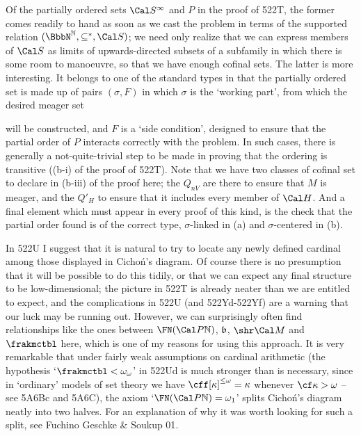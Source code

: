 {Of the partially ordered sets $\Cal S^{\infty}$ and $P$ in the proof of
522T, the former comes readily to hand as soon as we cast the problem in
terms of the supported relation $(\NN,\subseteq^*,\Cal S)$;  we need
only realize that we can express members of $\Cal S$ as limits of
upwards-directed subsets of a subfamily in which there is some room to
manoeuvre, so that we have enough cofinal sets.   The latter is more
interesting.   It belongs to one of the standard types in that the
partially ordered set is made up of pairs $(\sigma,F)$ in which $\sigma$
is the `working part', from which the desired meager set


\noindent will be constructed, and $F$ is a `side condition', designed
to ensure that the partial order of $P$ interacts correctly with the
problem.   In such cases, there is generally a not-quite-trivial step to
be made in proving that the ordering is transitive ((b-i) of the proof
of 522T).   Note that we have two classes of cofinal set to declare in
(b-iii) of the proof here;  the $Q_{nV}$ are there to ensure that $M$ is
meager, and the $Q'_H$ to ensure that it includes every member of
$\Cal H$.   And a final element which must appear in every proof of this
kind, is the check that the partial order found is of the correct
type, $\sigma$-linked in (a) and $\sigma$-centered in (b).

In 522U I suggest that it is natural to try to locate any newly defined
cardinal among those displayed in Cicho\'n's diagram.   Of course there
is no presumption that it will be possible to do this tidily, or that we
can expect any final structure to be low-dimensional;  the picture in
522T is already neater than we are entitled to expect, and the
complications in 522U (and 522Yd-522Yf) %
are a warning that our luck may be running out.   However, we can
surprisingly often find relationships like the ones between
$\FN(\Cal P\Bbb N)$, $\frak b$, $\shr\Cal M$ and $\frakmctbl$ here,
which is one of my reasons for using this approach.   It is very
remarkable that under fairly weak assumptions on cardinal arithmetic
(the hypothesis
`$\frakmctbl<\omega_{\omega}$' in 522Ud is much stronger than is
necessary, since in `ordinary' models of set theory we have
$\cff[\kappa]^{\le\omega}=\kappa$ whenever $\cf\kappa>\omega$ -- see
5A6Bc and 5A6C),
the axiom `$\FN(\Cal P\Bbb N)=\omega_1$' splits Cicho\'n's diagram neatly
into two halves.   For an explanation of why it was worth looking for
such a split, see {\smc Fuchino Geschke \& Soukup 01}.

}
